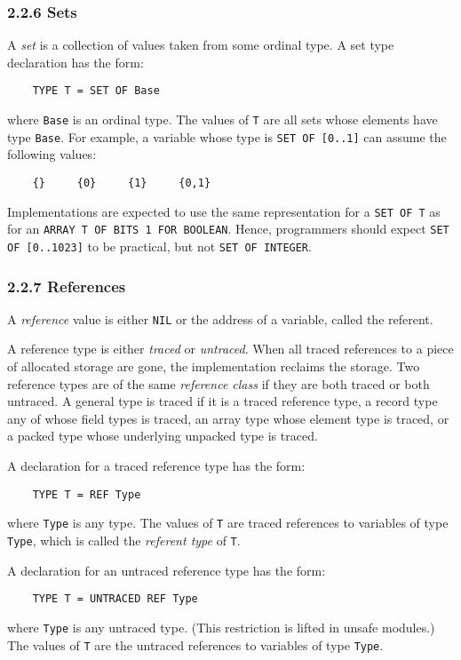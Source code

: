 \documentclass[10pt]{article}
\begin{document}
\subsubsection*{2.2.6 Sets}

A \emph{set} is a collection of values taken from some ordinal type.  A set
type declaration has the form:
\begin{verbatim}
    TYPE T = SET OF Base
\end{verbatim}
where \verb|Base| is an ordinal type.  The values of \verb|T| are all sets
whose elements have type \verb|Base|.  For example, a variable whose type is
\verb|SET OF [0..1]| can assume the following values:
\begin{verbatim}
    {}     {0}     {1}     {0,1}
\end{verbatim}

Implementations are expected to use the same representation for a
\verb|SET OF T| as for an \texttt{ARRAY T OF BITS 1 FOR BOOLEAN}.  Hence,
programmers should expect \verb|SET OF [0..1023]| to be practical, but not
\verb|SET OF INTEGER|.

\subsubsection*{2.2.7 References}

A \emph{reference} value is either \verb|NIL| or the address of a variable,
called the referent.

A reference type is either \emph{traced} or \emph{untraced}.  When all traced
references to a piece of allocated storage are gone, the implementation
reclaims the storage.  Two reference types are of the same \emph{reference
  class} if they are both traced or both untraced.  A general type is traced
if it is a traced reference type, a record type any of whose field types is
traced, an array type whose element type is traced, or a packed type whose
underlying unpacked type is traced.

A declaration for a traced reference type has the form:
\begin{verbatim}
    TYPE T = REF Type
\end{verbatim}
where \verb|Type| is any type.  The values of \verb|T| are traced references
to variables of type \verb|Type|, which is called the \emph{referent type} of
\verb|T|.

A declaration for an untraced reference type has the form:
\begin{verbatim}
    TYPE T = UNTRACED REF Type
\end{verbatim}
where \verb|Type| is any untraced type.  (This restriction is lifted in unsafe
modules.) The values of \verb|T| are the untraced references to variables of
type \verb|Type|.
\end{document}
